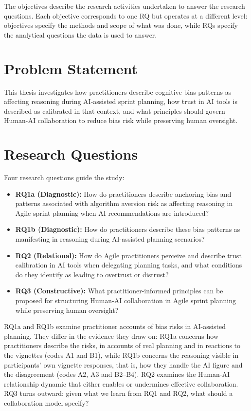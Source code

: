 \documentclass[a4paper,twoside]{bth}
\begin{document}
The objectives describe the research activities undertaken to answer the research questions. Each objective corresponds to one RQ but operates at a different level: objectives specify the methods and scope of what was done, while RQs specify the analytical questions the data is used to answer.

\section{Problem Statement}

This thesis investigates how practitioners describe cognitive bias patterns as affecting reasoning during AI-assisted sprint planning, how trust in AI tools is described as calibrated in that context, and what principles should govern Human-AI collaboration to reduce bias risk while preserving human oversight.

\section{Research Questions}

Four research questions guide the study:

\begin{itemize}
  \item \textbf{RQ1a (Diagnostic):} How do practitioners describe anchoring bias and patterns associated with algorithm aversion risk as affecting reasoning in Agile sprint planning when AI recommendations are introduced?
  \item \textbf{RQ1b (Diagnostic):} How do practitioners describe these bias patterns as manifesting in reasoning during AI-assisted planning scenarios?
  \item \textbf{RQ2 (Relational):} How do Agile practitioners perceive and describe trust calibration in AI tools when delegating planning tasks, and what conditions do they identify as leading to overtrust or distrust?
  \item \textbf{RQ3 (Constructive):} What practitioner-informed principles can be proposed for structuring Human-AI collaboration in Agile sprint planning while preserving human oversight?
\end{itemize}

RQ1a and RQ1b examine practitioner accounts of bias risks in AI-assisted planning. They differ in the evidence they draw on: RQ1a concerns how practitioners describe the risks, in accounts of real planning and in reactions to the vignettes (codes A1 and B1), while RQ1b concerns the reasoning visible in participants' own vignette responses, that is, how they handle the AI figure and the disagreement (codes A2, A3 and B2--B4). RQ2 examines the Human-AI relationship dynamic that either enables or undermines effective collaboration. RQ3 turns outward: given what we learn from RQ1 and RQ2, what should a collaboration model specify?
\end{document}

